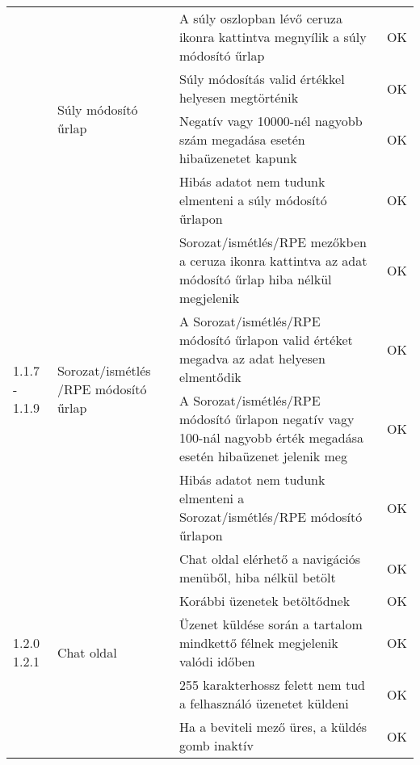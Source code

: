 \begin{center}
\begin{longtable}{ | p{} | p{} | p{} | p{} | }
			\pagebreak

			\multirow{4}{=}{1.1.4 - 1.1.6} 
			& \multirow{4}{=}{Súly módosító űrlap} 
			& A súly oszlopban lévő ceruza ikonra kattintva megnyílik a súly módosító űrlap
			& OK \\
			\cline{3-4}
			& & Súly módosítás valid értékkel helyesen megtörténik
			& OK \\
			\cline{3-4}
			& & Negatív vagy 10000-nél nagyobb szám megadása esetén hibaüzenetet kapunk
			& OK \\
			\cline{3-4}
			& & Hibás adatot nem tudunk elmenteni a súly módosító űrlapon
			& OK \\
			\hline


			\multirow{4}{=}{1.1.7 - 1.1.9} 
			& \multirow{4}{=}{Sorozat/ismétlés /RPE módosító űrlap}
			& Sorozat/ismétlés/RPE mezőkben a ceruza ikonra kattintva az adat módosító űrlap hiba nélkül megjelenik
			& OK \\
			\cline{3-4}
			& & A Sorozat/ismétlés/RPE módosító űrlapon valid értéket megadva az adat helyesen elmentődik
			& OK \\
			\cline{3-4}
			& & A Sorozat/ismétlés/RPE módosító űrlapon negatív vagy 100-nál nagyobb érték megadása esetén hibaüzenet jelenik meg
			& OK \\
			\cline{3-4}
			& & Hibás adatot nem tudunk elmenteni a Sorozat/ismétlés/RPE módosító űrlapon
			& OK \\
			\hline

			\multirow{5}{=}{1.2.0 1.2.1} 
			& \multirow{5}{=}{Chat oldal}
			& Chat oldal elérhető a navigációs menüből, hiba nélkül betölt
			& OK \\
			\cline{3-4}
			& & Korábbi üzenetek betöltődnek
			& OK \\
			\cline{3-4}
			& & Üzenet küldése során a tartalom mindkettő félnek megjelenik valódi időben
			& OK \\
			\cline{3-4}
			& & 255 karakterhossz felett nem tud a felhasználó üzenetet küldeni
			& OK \\
			\cline{3-4}
			& & Ha a beviteli mező üres, a küldés gomb inaktív
			& OK \\
			\hline


\end{longtable}
\end{center}
